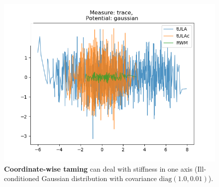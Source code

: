 \begin{figure}[H]
\centering
  \begin{minipage}[b]{0.49\textwidth}
  \centering
    \includegraphics[width=\textwidth]{Figures/tula_tulac_rwm_stiff.png}
  \end{minipage} %
   \caption{\textbf{Coordinate-wise taming} can deal with stiffness in one axis (Ill-conditioned Gaussian distribution with covariance $\text{diag}(1.0, 0.01)$).}
\end{figure}



